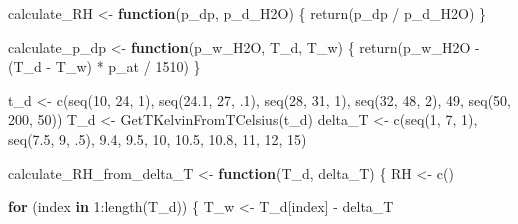 \documentclass[
  12pt,
  a4paper,
  onecolumn, twoside]{article}
\newenvironment{Shaded}{\begin{snugshade}}{\end{snugshade}}
\newcommand{\ControlFlowTok}[1]{\textcolor[rgb]{0.13,0.29,0.53}{\textbf{#1}}}
\newcommand{\DecValTok}[1]{\textcolor[rgb]{0.00,0.00,0.81}{#1}}
\newcommand{\FloatTok}[1]{\textcolor[rgb]{0.00,0.00,0.81}{#1}}
\newcommand{\FunctionTok}[1]{\textcolor[rgb]{0.00,0.00,0.00}{#1}}
\newcommand{\NormalTok}[1]{#1}
\newcommand{\OtherTok}[1]{\textcolor[rgb]{0.56,0.35,0.01}{#1}}
\newcommand{\SpecialCharTok}[1]{\textcolor[rgb]{0.00,0.00,0.00}{#1}}
\begin{document}
\begin{Shaded}
\begin{Highlighting}[numbers=left,,]
\NormalTok{calculate\_RH }\OtherTok{\textless{}{-}} \ControlFlowTok{function}\NormalTok{(p\_dp, p\_d\_H2O) \{}
  \FunctionTok{return}\NormalTok{(p\_dp }\SpecialCharTok{/}\NormalTok{ p\_d\_H2O)}
\NormalTok{\}}

\NormalTok{calculate\_p\_dp }\OtherTok{\textless{}{-}} \ControlFlowTok{function}\NormalTok{(p\_w\_H2O, T\_d, T\_w) \{}
  \FunctionTok{return}\NormalTok{(p\_w\_H2O }\SpecialCharTok{{-}}\NormalTok{ (T\_d }\SpecialCharTok{{-}}\NormalTok{ T\_w) }\SpecialCharTok{*}\NormalTok{ p\_at }\SpecialCharTok{/} \DecValTok{1510}\NormalTok{)}
\NormalTok{\}}

\NormalTok{t\_d }\OtherTok{\textless{}{-}} \FunctionTok{c}\NormalTok{(}\FunctionTok{seq}\NormalTok{(}\DecValTok{10}\NormalTok{, }\DecValTok{24}\NormalTok{, }\DecValTok{1}\NormalTok{), }\FunctionTok{seq}\NormalTok{(}\FloatTok{24.1}\NormalTok{, }\DecValTok{27}\NormalTok{, .}\DecValTok{1}\NormalTok{), }\FunctionTok{seq}\NormalTok{(}\DecValTok{28}\NormalTok{, }\DecValTok{31}\NormalTok{, }\DecValTok{1}\NormalTok{), }\FunctionTok{seq}\NormalTok{(}\DecValTok{32}\NormalTok{, }\DecValTok{48}\NormalTok{, }\DecValTok{2}\NormalTok{), }\DecValTok{49}\NormalTok{, }\FunctionTok{seq}\NormalTok{(}\DecValTok{50}\NormalTok{, }\DecValTok{200}\NormalTok{, }\DecValTok{50}\NormalTok{))}
\NormalTok{T\_d }\OtherTok{\textless{}{-}} \FunctionTok{GetTKelvinFromTCelsius}\NormalTok{(t\_d)}
\NormalTok{delta\_T }\OtherTok{\textless{}{-}} \FunctionTok{c}\NormalTok{(}\FunctionTok{seq}\NormalTok{(}\DecValTok{1}\NormalTok{, }\DecValTok{7}\NormalTok{, }\DecValTok{1}\NormalTok{), }\FunctionTok{seq}\NormalTok{(}\FloatTok{7.5}\NormalTok{, }\DecValTok{9}\NormalTok{, .}\DecValTok{5}\NormalTok{), }\FloatTok{9.4}\NormalTok{, }\FloatTok{9.5}\NormalTok{, }\DecValTok{10}\NormalTok{, }\FloatTok{10.5}\NormalTok{, }\FloatTok{10.8}\NormalTok{, }\DecValTok{11}\NormalTok{, }\DecValTok{12}\NormalTok{, }\DecValTok{15}\NormalTok{)}

\NormalTok{calculate\_RH\_from\_delta\_T }\OtherTok{\textless{}{-}} \ControlFlowTok{function}\NormalTok{(T\_d, delta\_T) \{}
\NormalTok{  RH }\OtherTok{\textless{}{-}} \FunctionTok{c}\NormalTok{()}
  
  \ControlFlowTok{for}\NormalTok{ (index }\ControlFlowTok{in} \DecValTok{1}\SpecialCharTok{:}\FunctionTok{length}\NormalTok{(T\_d)) \{}
\NormalTok{    T\_w }\OtherTok{\textless{}{-}}\NormalTok{ T\_d[index] }\SpecialCharTok{{-}}\NormalTok{ delta\_T}
    

\end{Highlighting}
\end{Shaded}
\end{document}

